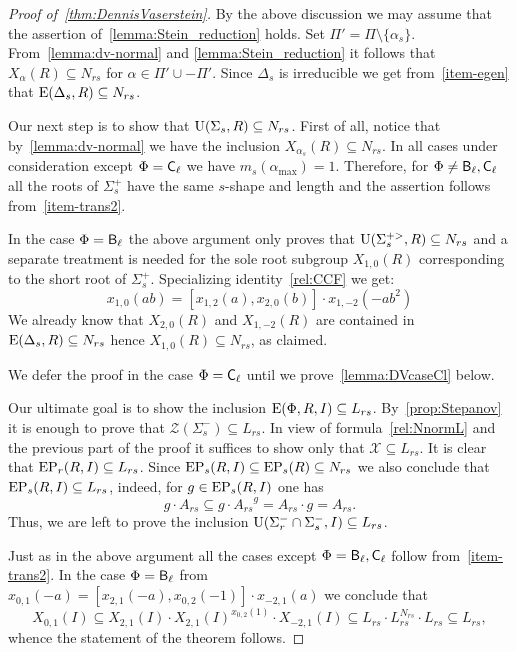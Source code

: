 \begin{proof}[Proof of~\cref{thm:DennisVaserstein}]
By the above discussion we may assume that the assertion of~\cref{lemma:Stein_reduction} holds.
Set $\Pi' = \Pi \setminus \{\alpha_s\}$.
From~\cref{lemma:dv-normal} and \cref{lemma:Stein_reduction} it follows that $X_\alpha(R) \subseteq N_{rs}$ for $\alpha \in \Pi' \cup -\Pi'$.
Since $\Delta_s$ is irreducible we get from~\cref{item-egen} that $\operatorname{E}(\Delta_s, R) \subseteq N_{rs}$.

Our next step is to show that $\operatorname{U}(\Sigma_s, R) \subseteq N_{rs}$.
First of all, notice that by~\cref{lemma:dv-normal} we have the inclusion $X_{\alpha_s}(R) \subseteq N_{rs}$.
In all cases under consideration except $\Phi=\mathsf{C}_\ell$ we have $m_s(\alpha_{\mathrm{max}})=1$.
Therefore, for $\Phi\neq \mathsf{B}_\ell, \mathsf{C}_\ell$ all the roots of $\Sigma^+_s$ have the same $s$-shape and length and the assertion follows from~\cref{item-trans2}.

In the case $\Phi=\mathsf{B}_\ell$ the above argument only proves that $\operatorname{U}(\Sigma_s^{+>}, R) \subseteq N_{rs}$ and a separate treatment is needed for the sole root subgroup $X_{1,0}(R)$ corresponding to the short root of $\Sigma_s^+$.
Specializing identity~\eqref{rel:CCF} we get:
\begin{equation*} \label{rel:CCF-specBC} x_{1,0}(ab) = [x_{1, 2}(a), x_{2, 0}(b)] \cdot x_{1,-2}(-a b^2) \end{equation*}
We already know that $X_{2, 0}(R)$ and $X_{1,-2}(R)$ are contained in $\operatorname{E}(\Delta_s, R) \subseteq N_{rs}$ hence $X_{1,0}(R) \subseteq N_{rs}$, as claimed.

We defer the proof in the case $\Phi=\mathsf{C}_\ell$ until we prove~\cref{lemma:DVcaseCl} below.

Our ultimate goal is to show the inclusion $\operatorname{E}(\Phi, R, I) \subseteq L_{rs}$. 
By~\cref{prop:Stepanov} it is enough to prove that $\mathcal{Z}(\Sigma^-_s) \subseteq L_{rs}$.
In view of formula~\eqref{rel:NnormL} and the previous part of the proof it suffices to show only that $\mathcal{X} \subseteq L_{rs}$.
It is clear that $\operatorname{EP}_r(R, I) \subseteq L_{rs}$.
Since $\operatorname{EP}_s(R, I) \subseteq \operatorname{EP}_s(R) \subseteq N_{rs}$ we also conclude that $\operatorname{EP}_s(R, I) \subseteq L_{rs}$, indeed, for $g \in \operatorname{EP}_s(R,I)$ one has
\[ g \cdot A_{rs} \subseteq g \cdot {A_{rs}}^g = A_{rs} \cdot g = A_{rs}. \]
Thus, we are left to prove the inclusion $\operatorname{U}(\Sigma^-_r \cap \Sigma^-_s, I) \subseteq L_{rs}$.

Just as in the above argument all the cases except $\Phi = \mathsf{B}_\ell, \mathsf{C}_\ell$ follow from~\cref{item-trans2}.
In the case $\Phi=\mathsf{B}_\ell$ from $x_{0, 1}(-a) = [x_{2,1}(-a), x_{0, 2}(-1)]\cdot x_{-2,1}(a)$ we conclude that
$$X_{0,1}(I) \subseteq X_{2,1}(I) \cdot X_{2,1}(I)^{x_{0,2}(1)} \cdot X_{-2,1}(I) \subseteq L_{rs} \cdot L_{rs}^{N_{rs}} \cdot L_{rs} \subseteq L_{rs},$$
whence the statement of the theorem follows. \end{proof}

